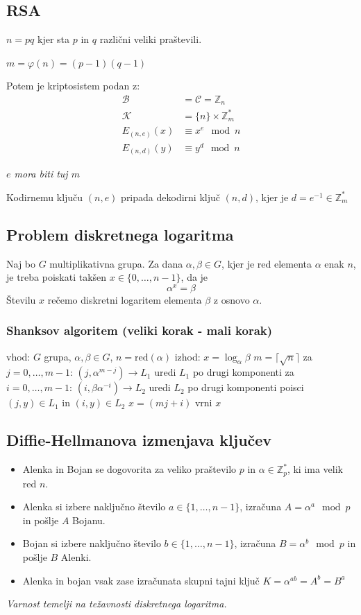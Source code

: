\begin{multicols}{5}
\subsection*{RSA}
$n = pq$ kjer sta $p$ in $q$ različni veliki praštevili.

$m = \varphi(n) = (p-1)(q-1)$

Potem je kriptosistem podan z:
\begin{align*}
	\mathcal{B} &= \mathcal{C} = \mathbb{Z}_n \\
	\mathcal{K} &= \{n\} \times \mathbb{Z}_m^* \\
	E_{(n,e)}(x) &\equiv x^e \mod n \\
	E_{(n,d)}(y) &\equiv y^d \mod n
\end{align*}

\textit{$e$ mora biti tuj $m$}

Kodirnemu ključu $(n, e)$ pripada dekodirni ključ $(n, d)$, kjer je $d = e^{-1} \in \mathbb{Z}_m^*$

\subsection*{Problem diskretnega logaritma}
Naj bo $G$ multiplikativna grupa. Za dana $\alpha, \beta \in G$, kjer je red elementa $\alpha$ enak $n$, 
je treba poiskati takšen $x \in \{0, \dots, n-1\}$, da je
\[ \alpha^x = \beta\]
Številu $x$ rečemo diskretni logaritem elementa $\beta$ z osnovo $\alpha$.

\subsubsection*{Shanksov algoritem (veliki korak - mali korak) }
\begin{koda}
vhod: $G$ grupa, $\alpha, \beta \in G$, $n = \text{red}(\alpha)$
izhod: $x = \log_\alpha \beta$
$m = \lceil \sqrt{n} \rceil$
za $j = 0, \dots, m-1$:
	$(j, \alpha^{m-j}) \to L_1$
uredi $L_1$ po drugi komponenti
za $i = 0, \dots, m-1$:
	$(i, \beta \alpha^{-i}) \to L_2$
uredi $L_2$ po drugi komponenti
poisci $(j, y) \in L_1$ in $(i, y) \in L_2$
$x = (mj + i)$
vrni $x$
\end{koda}

\subsection*{Diffie-Hellmanova izmenjava ključev}
\begin{itemize}
	\item Alenka in Bojan se dogovorita za veliko praštevilo $p$ in $\alpha \in \mathbb{Z}_p^*$, ki ima velik red $n$.
	\item Alenka si izbere naključno število $a \in \{1, \dots, n-1\}$,
	izračuna $A = \alpha^a \mod p$ in pošlje $A$ Bojanu.
	\item Bojan si izbere naključno število $b \in \{1, \dots, n-1\}$, 
	izračuna $B = \alpha^b \mod p$ in pošlje $B$ Alenki.
	\item Alenka in bojan vsak zase izračunata skupni tajni ključ $K = \alpha^{ab} = A^b = B^a$
\end{itemize}
\textit{Varnost temelji na težavnosti diskretnega logaritma.}


\end{multicols}
